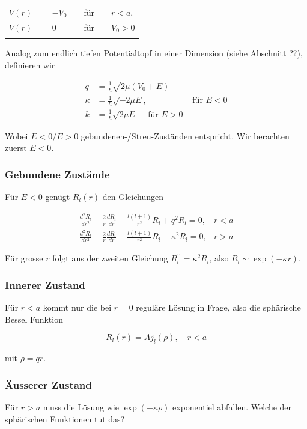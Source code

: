 \documentclass[10pt, letterpaper]{article}
\begin{document}
\begin{center}
\begin{tabular}{rlrlrl}
$V(r)$ & $=-V_{0}$ &  & für &  & $r<a$, \\
$V(r)$ & $=0$ &  & für &  & $V_{0}>0$ \\
 &  &  &  &  &  \\
\hline
\end{tabular}
\end{center}

Analog zum endlich tiefen Potentialtopf in einer Dimension (siehe Abschnitt ??), definieren wir

$$
\begin{array}{rlr}
q & =\frac{1}{\hbar} \sqrt{2 \mu\left(V_{0}+E\right)} & \\
\kappa & =\frac{1}{\hbar} \sqrt{-2 \mu E}, & \text { für } E<0 \\
k & =\frac{1}{\hbar} \sqrt{2 \mu E} \quad \text { für } E>0
\end{array}
$$

Wobei $E<0 / E>0$ gebundenen-/Streu-Zuständen entspricht. Wir berachten zuerst $E<0$.

\subsubsection*{Gebundene Zustände}
Für $E<0$ genügt $R_{l}(r)$ den Gleichungen

$$
\begin{array}{ll}
\frac{d^{2} R_{l}}{d r^{2}}+\frac{2}{r} \frac{d R_{l}}{d r}-\frac{l(l+1)}{r^{2}} R_{l}+q^{2} R_{l}=0, & r<a \\
\frac{d^{2} R_{l}}{d r^{2}}+\frac{2}{r} \frac{d R_{l}}{d r}-\frac{l(l+1)}{r^{2}} R_{l}-\kappa^{2} R_{l}=0, & r>a
\end{array}
$$

Für grosse $r$ folgt aus der zweiten Gleichung $R_{l}^{\prime \prime}=\kappa^{2} R_{l}$, also $R_{l} \sim \exp (-\kappa r)$.

\subsubsection*{Innerer Zustand}
Für $r<a$ kommt nur die bei $r=0$ reguläre Lösung in Frage, also die sphärische Bessel Funktion

$$
R_{l}(r)=A j_{l}(\rho), \quad r<a
$$

mit $\rho=q r$.

\subsubsection*{Äusserer Zustand}
Für $r>a$ muss die Lösung wie $\exp (-\kappa \rho)$ exponentiel abfallen. Welche der sphärischen Funktionen tut das?
\end{document}
